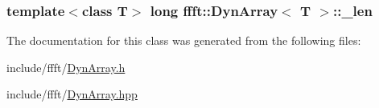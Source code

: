 \subsubsection[{\texorpdfstring{\+\_\+len}{_len}}]{\setlength{\rightskip}{0pt plus 5cm}template$<$class T$>$ long {\bf ffft\+::\+Dyn\+Array}$<$ T $>$\+::\+\_\+len\hspace{0.3cm}{\ttfamily [private]}}\hypertarget{classffft_1_1DynArray_ab598085ccf8352effe43635aec134cb6}{}\label{classffft_1_1DynArray_ab598085ccf8352effe43635aec134cb6}


The documentation for this class was generated from the following files\+:\begin{DoxyCompactItemize}
\item 
include/ffft/\hyperlink{DynArray_8h}{Dyn\+Array.\+h}\item 
include/ffft/\hyperlink{DynArray_8hpp}{Dyn\+Array.\+hpp}\end{DoxyCompactItemize}
